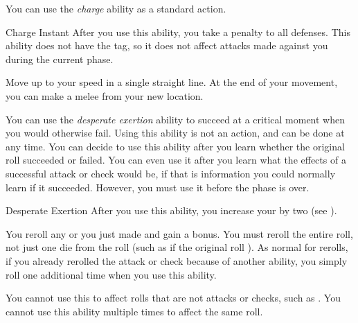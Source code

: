          You can use the \textit{charge} ability as a standard action.

        \begin{instantability}{Charge}
            \label{Charge}
            Instant
            \rankline
            After you use this ability, you  take a  penalty to all defenses.
            This ability does not have the  tag, so it does not affect attacks made against you during the current phase.

            Move up to your speed in a single straight line.
            At the end of your movement, you can make a melee  from your new location.
        \end{instantability}

        \label{Desperate Exertion} You can use the \textit{desperate exertion} ability to succeed at a critical moment when you would otherwise fail.
        Using this ability is not an action, and can be done at any time.
        You can decide to use this ability after you learn whether the original roll succeeded or failed.
        You can even use it after you learn what the effects of a successful attack or check would be, if that is information you could normally learn if it succeeded.
        However, you must use it before the phase is over.

        \begin{instantability}{Desperate Exertion}
            \label{Desperate Exertion}
            \rankline
            After you use this ability, you increase your  by two (see ).

            You reroll any  or  you just made and gain a  bonus.
            You must reroll the entire roll, not just one die from the roll (such as if the original roll ).
            As normal for rerolls, if you already rerolled the attack or check because of another ability, you simply roll one additional time when you use this ability.

            You cannot use this to affect rolls that are not attacks or checks, such as .
            You cannot use this ability multiple times to affect the same roll.
        \end{instantability}

